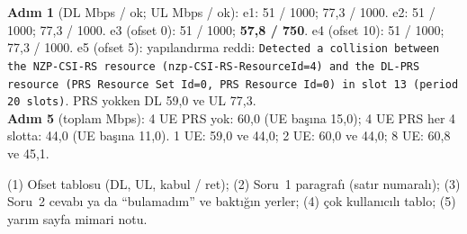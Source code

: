 \documentclass[10.5pt,a4paper]{article}
\begin{document}
\begin{kontrol}
\textbf{Adım 1} (DL Mbps / ok; UL Mbps / ok): e1: 51 / 1000; 77,3 / 1000. e2: 51 / 1000; 77,3 / 1000. e3 (ofset 0): 51 / 1000; \textbf{57,8 / 750}. e4 (ofset 10): 51 / 1000; 77,3 / 1000. e5 (ofset 5): yapılandırma reddi: \texttt{Detected a collision between the NZP-CSI-RS resource (nzp-CSI-RS-ResourceId=4) and the DL-PRS resource (PRS Resource Set Id=0, PRS Resource Id=0) in slot 13 (period 20 slots)}. PRS yokken DL 59,0 ve UL 77,3.\\
\textbf{Adım 5} (toplam Mbps): 4 UE PRS yok: 60,0 (UE başına 15,0); 4 UE PRS her 4 slotta: 44,0 (UE başına 11,0). 1 UE: 59,0 ve 44,0; 2 UE: 60,0 ve 44,0; 8 UE: 60,8 ve 45,1.
\end{kontrol}

\begin{teslim}
(1) Ofset tablosu (DL, UL, kabul / ret); (2) Soru~1 paragrafı (satır numaralı); (3) Soru~2 cevabı ya da ``bulamadım'' ve baktığın yerler; (4) çok kullanıcılı tablo; (5) yarım sayfa mimari notu.
\end{teslim}
\end{document}
